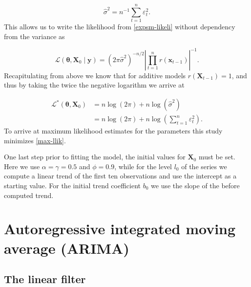 \begin{equation}
	\hat{\sigma}^{2}=n^{-1} \sum_{t=1}^{n} \varepsilon_{t}^{2}.
\end{equation}
%
This allows us to write the likelihood from \ref{expsm-likeli} without dependency from the variance as 

\begin{equation}
	\mathcal{L}\left(\boldsymbol{\theta}, \boldsymbol{X}_{0} \mid \boldsymbol{y}\right)=\left(2 \pi  \hat{\sigma}^{2}\right)^{-n / 2}\left|\prod_{t=1}^{n} r\left(\boldsymbol{x}_{t-1}\right)\right|^{-1}.
\end{equation}
%
Recapitulating from above we know that for additive models $r(\boldsymbol{X}_{t-1}) = 1$, and thus by taking the twice the negative logarithm we arrive at

\begin{equation}
	\label{max-llik}
	\begin{array}{rl}
	\mathcal{L}^{*}\left(\boldsymbol{\theta}, \boldsymbol{X}_{0}\right)&= n \log \left(2 \pi \right) + n \log \left( \hat{\sigma}^2	 \right) \\
	&= n \log \left(2 \pi \right) + n \log \left( \displaystyle \sum_{t=1}^{n} \varepsilon_{t}^{2}\right).
	\end{array}
\end{equation}
%
To arrive at maximum likelihood estimates for the parameters this study minimizes \ref{max-llik}.

One last step prior to fitting the model, the initial values for $\boldsymbol{X}_0$ must be set. Here we use $\alpha = \gamma = 0.5$ and $\phi = 0.9$, while for the level $l_0$ of the series we compute a linear trend of the first ten observations and use the intercept as a starting value. For the initial trend  coefficient $b_0$ we use the slope of the before computed trend.


\section{Autoregressive integrated moving average (ARIMA)}

\subsection{The linear filter}

